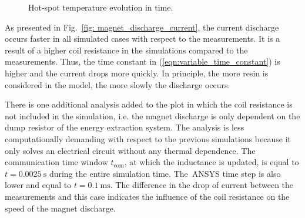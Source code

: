 \begin{figure}[H]
    \centering
    \caption{Hot-spot temperature evolution in time.}
    \label{fig: magnet_discharge_hot_spot}
\end{figure}

As presented in Fig.~\ref{fig: magnet_discharge_current}, the current discharge occurs faster in all simulated cases with respect to the measurements. It is a result of a higher coil resistance in the simulations compared to the measurements. Thus, the time constant in (\ref{eqn:variable_time_constant}) is higher and the current drops more quickly. In principle, the more resin is considered in the model, the more slowly the discharge occurs. 

There is one additional analysis added to the plot in which the coil resistance is not included in the simulation, i.e. the magnet discharge is only dependent on the dump resistor of the energy extraction system. The analysis is less computationally demanding with respect to the previous simulations because it only solves an electrical circuit without any thermal dependence. The communication time window $t_\text{com}$, at which the inductance is updated, is equal to $t=0.0025~\text{s}$ during the entire simulation time. The~ANSYS time step is also lower and equal to $t=0.1~\text{ms}$. The difference in the drop of current between the measurements and this case indicates the influence of the coil resistance on the speed of the magnet discharge.

